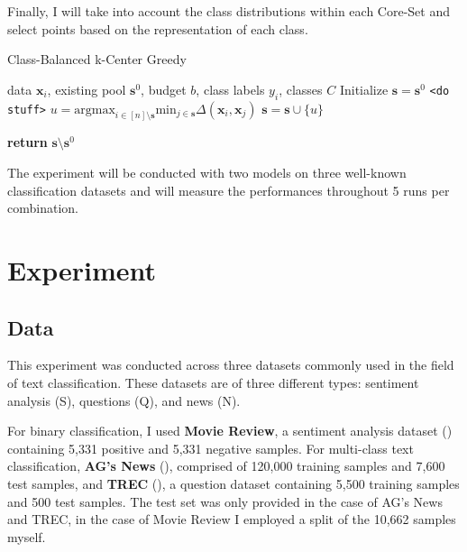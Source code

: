 \documentclass[english,bachelor,ul]{webisthesis} %
\begin{document}
Finally, I will take into account the class distributions within each Core-Set and select points based on the representation of each class.

\begin{algorithm}
    \caption{Class-Balanced k-Center Greedy}%
\makeatletter{}\makeatother
\label{alg:classbalanced}
\begin{algorithmic}


\Require data $ \mathbf{x}_i $, existing pool $ \mathbf{s}^0 $, budget $ b $, class labels $ y_i $, classes $ C $
\State Initialize $ \mathbf{s} = \mathbf{s}^0 $
\State \texttt{<do stuff>}
\EndFor
\Repeat
\State $ u = \text{argmax}_{i \in [n] \setminus \mathbf{s}} \text{min}_{j \in \mathbf{s}} \Delta(\mathbf{x}_i, \mathbf{x}_j) $
\State $ \mathbf{s} = \mathbf{s} \cup \{u\} $

\State \textbf{return} $\mathbf{s} \setminus \mathbf{s}^0 $
\end{algorithmic}
\end{algorithm}

The experiment will be conducted with two models on three well-known classification datasets and will measure the performances throughout 5 runs per combination. 

\chapter{Experiment}

\section{Data}

This experiment was conducted across three datasets commonly used in the field of text classification. These datasets are of three different types: sentiment analysis (S), questions (Q), and news (N). 

For binary classification, I used \textbf{Movie Review}, a sentiment analysis dataset (\cite{DBLP:conf/acl/PangL05}) containing 5,331 positive and 5,331 negative samples. For multi-class text classification, \textbf{AG's News} (\cite{DBLP:conf/nips/ZhangZL15}), comprised of 120,000 training samples and 7,600 test samples, and \textbf{TREC} (\cite{DBLP:journals/nle/LiR06}), a question dataset containing 5,500 training samples and 500 test samples. The test set was only provided in the case of AG's News and TREC, in the case of Movie Review I employed a split of the 10,662 samples myself.
\end{document}
